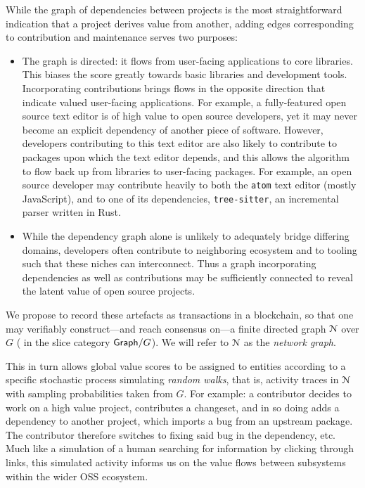 While the graph of dependencies between projects is the most straightforward
indication that a project derives value from another, adding edges corresponding
to contribution and maintenance serves two purposes:
\begin{itemize}
\item The graph is directed: it flows from user-facing applications to core
  libraries. This biases the score greatly towards basic libraries and
  development tools. Incorporating contributions brings flows in the
  opposite direction that indicate valued user-facing applications. For example,
  a fully-featured open source text editor is of high value to
  open source developers, yet it may never become an explicit dependency of another
  piece of software. However, developers contributing to this text editor are
  also likely to contribute to packages upon which the text editor depends, and this
  allows the algorithm to flow back up from libraries to user-facing
  packages. For example, an open source developer may contribute
  heavily to both the \texttt{atom} text editor (mostly JavaScript), and to
  one of its dependencies, \texttt{tree-sitter}, an incremental parser written
  in Rust.
\item While the dependency graph alone is unlikely to adequately bridge
  differing domains, developers often contribute to neighboring ecosystem and
  to tooling such that these niches can interconnect. Thus a graph incorporating
  dependencies as well as contributions may be sufficiently connected to
  reveal the latent value of open source projects.
\end{itemize}
We propose to record these artefacts as transactions in a blockchain, so that
one may verifiably construct---and reach consensus on---a finite directed graph
$\mathcal{N}$ over $G$ (\ie{} in the slice category $\mathsf{Graph}/G$). We will refer to
$\mathcal{N}$ as the \emph{network graph}.

This in turn allows global value scores to be assigned to entities
according to a specific stochastic process simulating \emph{random
  walks}, that is, activity traces in $\mathcal{N}$ with sampling
probabilities taken from $G$. For example: a contributor decides to
work on a high value project, contributes a changeset, and in so doing adds a
dependency to another project, which imports a bug from an upstream package. The
contributor therefore switches to fixing said bug in the dependency, etc. Much
like a simulation of a human searching for information by clicking through
links, this simulated activity informs us on the value flows
between subsystems within the wider OSS ecosystem.

